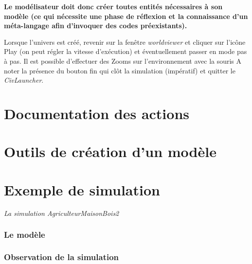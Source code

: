 \documentclass[a4paper,oneside,12 pt]{article}
\begin{document}
\vspace{10mm}

\textbf{Le modélisateur doit donc créer toutes entités nécessaires à son modèle (ce qui nécessite une phase de réflexion et la connaissance d'un méta-langage afin d'invoquer des codes préexistants).}


Lorsque l'univers est créé, revenir sur la fenêtre \textit{worldviewer} et cliquer sur l'icône Play (on peut régler la vitesse d'exécution) et éventuellement passer en mode pas à pas.
Il est possible d'effectuer des Zooms sur l'environnement  avec la souris 
A noter la présence du bouton fin qui clôt la simulation (impératif) et quitter le \textit{CivLauncher}.

\newpage
\part{Documentation des actions}
	
\newpage
\part{Outils de création d'un modèle}
	
\newpage
\part{Exemple de simulation }
\Large{\emph{La simulation AgriculteurMaisonBois2}}
 	\section{Le modèle}
		
		\clearpage
	\section{Observation de la simulation}
		
\end{document}
